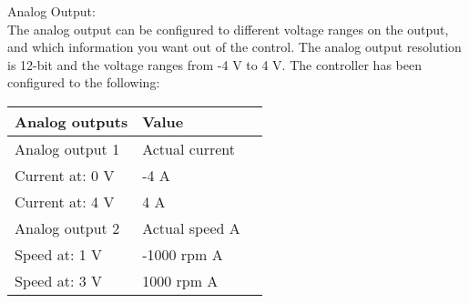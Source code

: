 Analog Output:\\
The analog output can be configured to different voltage ranges on the output, and which information you want out of the control.
The analog output resolution is 12-bit and the voltage ranges from -4 V to 4 V. The controller has been configured to the following:
\begin{table}[H]
	\begin{tabular}{|l|l|p{4.3cm}|}
		\hline%
		\textbf{Analog outputs}       &  \textbf{Value}         \\
		\hline%
		Analog output 1                                & Actual current           \\
		\hline%
		Current at: 0 V							  & -4 A              \\
		\hline%
		Current at: 4 V							  & 4 A              \\
		\hline%
		Analog output 2							  & Actual speed A              \\
		\hline%
		Speed at: 1 V							  & -1000 rpm A              \\
		\hline%
		Speed at: 3 V							  & 1000 rpm A              \\
		\hline%
	\end{tabular}
\end{table}

